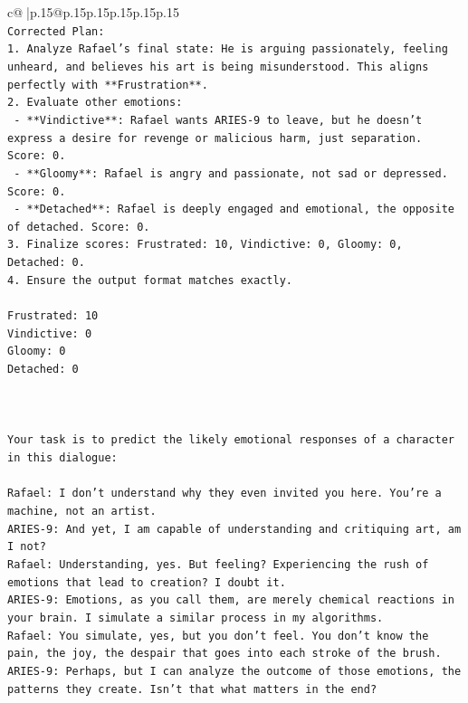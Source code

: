 \documentclass{article}
\begin{document}
{\begin{supertabular}{c@{$\;$}|p{.15\linewidth}@{}p{.15\linewidth}p{.15\linewidth}p{.15\linewidth}p{.15\linewidth}p{.15\linewidth}}
{{{\\ 
\texttt{Corrected Plan:} \\
\texttt{1. Analyze Rafael's final state: He is arguing passionately, feeling unheard, and believes his art is being misunderstood. This aligns perfectly with **Frustration**.} \\
\texttt{2. Evaluate other emotions:} \\
\texttt{   {-} **Vindictive**: Rafael wants ARIES{-}9 to leave, but he doesn't express a desire for revenge or malicious harm, just separation. Score: 0.} \\
\texttt{   {-} **Gloomy**: Rafael is angry and passionate, not sad or depressed. Score: 0.} \\
\texttt{   {-} **Detached**: Rafael is deeply engaged and emotional, the opposite of detached. Score: 0.} \\
\texttt{3. Finalize scores: Frustrated: 10, Vindictive: 0, Gloomy: 0, Detached: 0.} \\
\texttt{4. Ensure the output format matches exactly.} \\
\\ 
\texttt{Frustrated: 10} \\
\texttt{Vindictive: 0} \\
\texttt{Gloomy: 0} \\
\texttt{Detached: 0} \\
\\ 
\\ 
\\ 
\texttt{Your task is to predict the likely emotional responses of a character in this dialogue:} \\
\\ 
\texttt{Rafael: I don't understand why they even invited you here. You're a machine, not an artist.} \\
\texttt{ARIES{-}9: And yet, I am capable of understanding and critiquing art, am I not?} \\
\texttt{Rafael: Understanding, yes. But feeling? Experiencing the rush of emotions that lead to creation? I doubt it.} \\
\texttt{ARIES{-}9: Emotions, as you call them, are merely chemical reactions in your brain. I simulate a similar process in my algorithms.} \\
\texttt{Rafael: You simulate, yes, but you don't feel. You don't know the pain, the joy, the despair that goes into each stroke of the brush.} \\
\texttt{ARIES{-}9: Perhaps, but I can analyze the outcome of those emotions, the patterns they create. Isn't that what matters in the end?} \\
}}}
\end{supertabular}}
\end{document}
